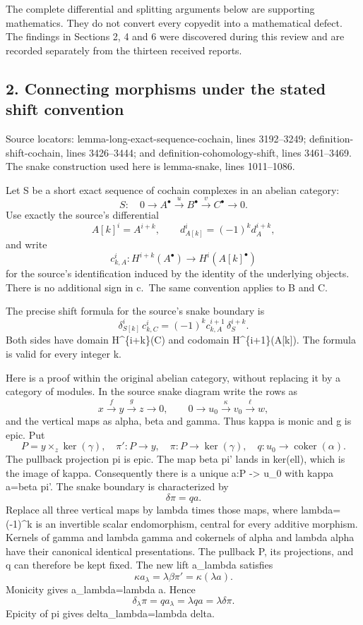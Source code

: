 \documentclass[11pt]{article}
\begin{document}
The complete differential and splitting arguments below are supporting mathematics. They do not convert every copyedit into a mathematical defect. The findings in Sections 2, 4 and 6 were discovered during this review and are recorded separately from the thirteen received reports.

\subsection{2. Connecting morphisms under the stated shift convention}\label{note-03-connecting-morphisms-under-the-stated-shift-convention}

Source locators: lemma-long-exact-sequence-cochain, lines 3192--3249; definition-shift-cochain, lines 3426--3444; and definition-cohomology-shift, lines 3461--3469. The snake construction used here is lemma-snake, lines 1011--1086.

Let S be a short exact sequence of cochain complexes in an abelian category: \[
S:\quad 0\longrightarrow A^\bullet\xrightarrow{u}B^\bullet
\xrightarrow{v}C^\bullet\longrightarrow0.
\] Use exactly the source's differential \[
A[k]^i=A^{i+k},\qquad d_{A[k]}^i=(-1)^k d_A^{i+k},
\] and write \[
c_{k,A}^i:H^{i+k}(A^\bullet)\longrightarrow H^i(A[k]^\bullet)
\] for the source's identification induced by the identity of the underlying objects. There is no additional sign in c.~The same convention applies to B and C.

The precise shift formula for the source's snake boundary is \[
\boxed{\quad
\delta_{S[k]}^i\,c_{k,C}^i
 =(-1)^k c_{k,A}^{i+1}\,\delta_S^{i+k}.
\quad}                                                    \tag{2.1}
\] Both sides have domain H\^{}\{i+k\}(C) and codomain H\^{}\{i+1\}(A{[}k{]}). The formula is valid for every integer k.

Here is a proof within the original abelian category, without replacing it by a category of modules. In the source snake diagram write the rows as \[
x\xrightarrow{f}y\xrightarrow{g}z\longrightarrow0,\qquad
0\longrightarrow u_0\xrightarrow{\kappa}v_0
\xrightarrow{\ell}w,
\] and the vertical maps as alpha, beta and gamma. Thus kappa is monic and g is epic. Put \[
P=y\times_z\ker(\gamma),\quad
\pi':P\longrightarrow y,\quad
\pi:P\longrightarrow\ker(\gamma),\quad
q:u_0\longrightarrow\operatorname{coker}(\alpha).
\] The pullback projection pi is epic. The map beta pi' lands in ker(ell), which is the image of kappa. Consequently there is a unique a:P -\textgreater{} u\_0 with kappa a=beta pi'. The snake boundary is characterized by \[
\delta\pi=qa.
\] Replace all three vertical maps by lambda times those maps, where lambda=(-1)\^{}k is an invertible scalar endomorphism, central for every additive morphism. Kernels of gamma and lambda gamma and cokernels of alpha and lambda alpha have their canonical identical presentations. The pullback P, its projections, and q can therefore be kept fixed. The new lift a\_lambda satisfies \[
\kappa a_\lambda=\lambda\beta\pi'
 =\kappa(\lambda a).
\] Monicity gives a\_lambda=lambda a. Hence \[
\delta_\lambda\pi=q a_\lambda
 =\lambda q a=\lambda\delta\pi.
\] Epicity of pi gives delta\_lambda=lambda delta.
\end{document}
